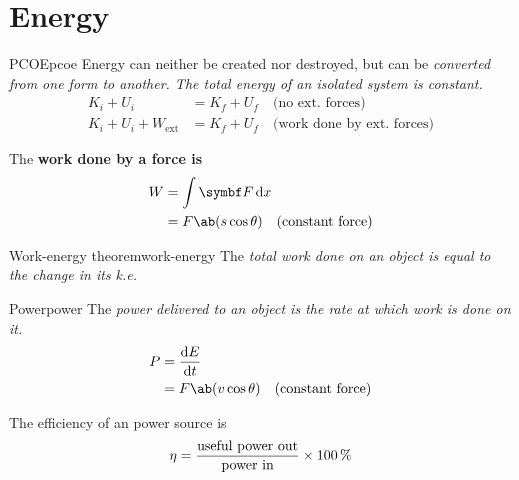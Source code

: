 \chapter{Energy}
\begin{definition}{PCOE}{pcoe}
	Energy can neither be created nor destroyed, but can be \it{converted} from one form to another.
	The \it{total energy} of an \it{isolated system} is constant.
	\begin{align*}
		K_i + U_i                & = K_f + U_f\quad\text{(no ext.~forces)}           \\
		K_i + U_i + W_\text{ext} & = K_f + U_f\quad\text{(work done by ext.~forces)}
	\end{align*}
\end{definition}

The \bf{work done} by a force is
\begin{align*}
	W & = \int \va{F} \odif{x}                          \\
	  & = F\ab(s\cos\theta)\quad\text{(constant force)}
\end{align*}

\begin{definition}{Work-energy theorem}{work-energy}
	The \it{total work done} on an object is equal to the change in its k.e.
\end{definition}

\begin{definition}{Power}{power}
	The \it{power} delivered to an object is the rate at which work is done on it.
	\begin{align*}
		P & = \odv{E}{t}                                    \\
		  & = F\ab(v\cos\theta)\quad\text{(constant force)}
	\end{align*}
\end{definition}
The efficiency of an power source is
\[\eta = \frac{\text{useful power out}}{\text{power in}}\times\qty{100}{\percent}\]
